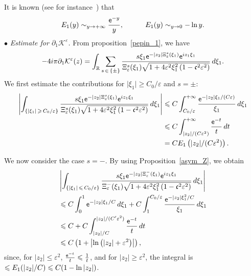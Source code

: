 \documentclass[10pt]{amsart}
\theoremstyle{definition}\newtheorem{defi}[theo]{Definition}\newtheorem{rema}[theo]{Remark}\newtheorem{exam}[theo]{Example}\newtheorem{exem}[theo]{Example}\newtheorem{nota}[theo]{Notation}
\newcommand*\p{\partial}
\newcommand*\R{\mathbb R}
\newcommand*\BK{\mathcal{K}}
\newcommand*\ex{{\sf e}}
\newcommand*\cs{{\mathfrak c}}
\newcommand*\ii{\infty}
\newcommand*\gs{\geqslant }
\newcommand*\ls{\leqslant }
\newcommand*\e{\varepsilon}
\begin{document}
It is known (see for instance~\cite{Abr-Steg}) that
\begin{equation}\label{asymp_E1}
E_1 (y) \sim_{y \to +\ii} \frac{\ex^{-y}}{y},
\quad \quad \quad E_1 (y) \sim_{y \to 0} - \ln y.
\end{equation}
$ \bullet $ \emph{Estimate for $ \p_1 \BK^\e $.} From proposition~\ref{pepin_1}, we have
\[
- 4 i \pi \p_1 \BK^\e (z) =
\int_{\R} \sum_{s\,\in\,\{ \pm \} } \frac{ s \xi_1 \ex^{- |z_2| \Xi_\e^s (\xi_1)} \ex^{i z_1 \xi_1} }{\Xi_\e^s (\xi_1)
\sqrt{1 + 4\e^2 \xi_1^2\left(1 - \cs^2 \e^2\right)}} \, d\xi_1.
\]
We first estimate the contributions for $ \lvert \xi_1 \rvert \gs C_0 / \e $ and $ s = \pm $:
\begin{align*}
\left\lvert \int_{\left\{\left\lvert \xi_1 \right\rvert\,\gs\,C_0/ \e \right\}}
\frac{ s \xi_1 \ex^{- |z_2| \Xi_\e^s (\xi_1)} \ex^{i z_1 \xi_1} }{\Xi_\e^s (\xi_1)
\sqrt{1 + 4\e^2 \xi_1^2 \left(1 - \cs^2 \e^2\right)}} \, d\xi_1 \right\rvert &\ls C \int_{C_0 / \e }^{+\ii} \frac{\ex^{- |z_2| \xi_1 / (C \e) }}{ \xi_1 } \, d\xi_1
\\&
\ls C \int_{|z_2|/(C\e^2)}^{+\ii} \frac{\ex^{-t}}{t} \, d t
\\& = C E_1 \left(|z_2|/ (C\e^2) \right).
\end{align*}

We now consider the case $ s= - $. By using Proposition~\ref{asym_Z}, we obtain
\begin{multline*}
\left\lvert \int_{\left\{\lvert \xi_1 \rvert \,\ls\,C_0 / \e \right\}}
\frac{ s \xi_1 \ex^{- |z_2| \Xi_\e^- (\xi_1)} \ex^{i z_1 \xi_1} }{\Xi_\e^- (\xi_1)
\sqrt{1 + 4\e^2 \xi_1^2\left(1 - \cs^2 \e^2\right)}} \, d\xi_1 \right\rvert
\\
\begin{aligned}
&\ls C \int_{0}^{1} \ex^{- |z_2| \xi_1 / C} \, d \xi_1 + C \int_{1}^{C_0/ \e} \frac{\ex^{- |z_2| \xi_1^2 /C}}{ \xi_1 } \, d \xi_1
\\ &
\ls C + C \int_{|z_2|/C}^{|z_2|/(C'\e^2)} \frac{\ex^{-t}}{t} \, d t
\\ &
\ls C \left(1 + \left\lvert \ln \left(|z_2| +\e^2\right) \right\rvert\right),
\end{aligned}
\end{multline*}
since, for $ |z_2| \ls \e^2 $, $ \frac{\ex^{-t}}{t} \ls \frac{1}{t} $, and for $ | z_2| \gs \e^2 $, the integral is $ \ls E_1 (|z_2|/C)\linebreak\ls C (1 - \ln |z_2|) $.
\end{document}
